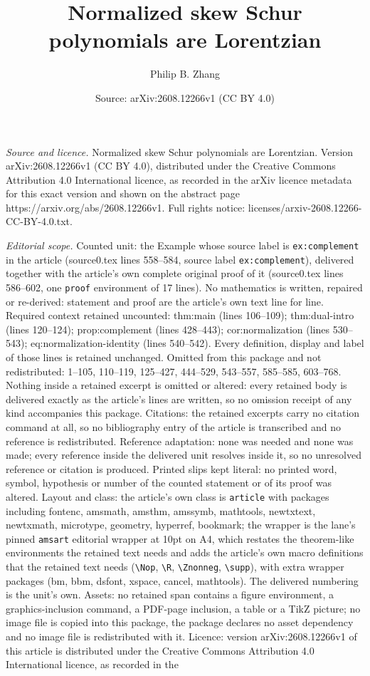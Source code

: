 \documentclass[10pt,a4paper]{amsart}
\title[Normalized skew Schur polynomials are Lorentzian]{Normalized skew Schur polynomials are Lorentzian}
\author{Philip B. Zhang}
\date{Source: arXiv:2608.12266v1 (CC BY 4.0)}
\begin{document}
\maketitle

\noindent\emph{Source and licence.} Normalized skew Schur polynomials are Lorentzian. Version arXiv:2608.12266v1 (CC BY 4.0), distributed under the Creative Commons Attribution 4.0 International licence, as recorded in the arXiv licence metadata for this exact version and shown on the abstract page https://arxiv.org/abs/2608.12266v1. Full rights notice: licenses/arxiv-2608.12266-CC-BY-4.0.txt.\par\smallskip

\noindent\textit{Editorial scope.} Counted unit: the Example whose source label is \texttt{ex:complement} in the article (source0.tex lines 558--584, source label \texttt{ex:complement}), delivered together with the article's own complete original proof of it (source0.tex lines 586--602, one \texttt{proof} environment of 17 lines). No mathematics is written, repaired or re-derived: statement and proof are the article's own text line for line. Required context retained uncounted: thm:main (lines 106--109); thm:dual-intro (lines 120--124); prop:complement (lines 428--443); cor:normalization (lines 530--543); eq:normalization-identity (lines 540--542). Every definition, display and label of those lines is retained unchanged. Omitted from this package and not redistributed: 1--105, 110--119, 125--427, 444--529, 543--557, 585--585, 603--768. Nothing inside a retained excerpt is omitted or altered: every retained body is delivered exactly as the article's lines are written, so no omission receipt of any kind accompanies this package. Citations: the retained excerpts carry no citation command at all, so no bibliography entry of the article is transcribed and no reference is redistributed. Reference adaptation: none was needed and none was made; every reference inside the delivered unit resolves inside it, so no unresolved reference or citation is produced. Printed slips kept literal: no printed word, symbol, hypothesis or number of the counted statement or of its proof was altered. Layout and class: the article's own class is \texttt{article} with packages including fontenc, amsmath, amsthm, amssymb, mathtools, newtxtext, newtxmath, microtype, geometry, hyperref, bookmark; the wrapper is the lane's pinned \texttt{amsart} editorial wrapper at 10pt on A4, which restates the theorem-like environments the retained text needs and adds the article's own macro definitions that the retained text needs (\texttt{\textbackslash Nop}, \texttt{\textbackslash R}, \texttt{\textbackslash Znonneg}, \texttt{\textbackslash supp}), with extra wrapper packages (bm, bbm, dsfont, xspace, cancel, mathtools). The delivered numbering is the unit's own. Assets: no retained span contains a figure environment, a graphics-inclusion command, a PDF-page inclusion, a table or a TikZ picture; no image file is copied into this package, the package declares no asset dependency and no image file is redistributed with it. Licence: version arXiv:2608.12266v1 of this article is distributed under the Creative Commons Attribution 4.0 International licence, as recorded in the 
\end{document}
